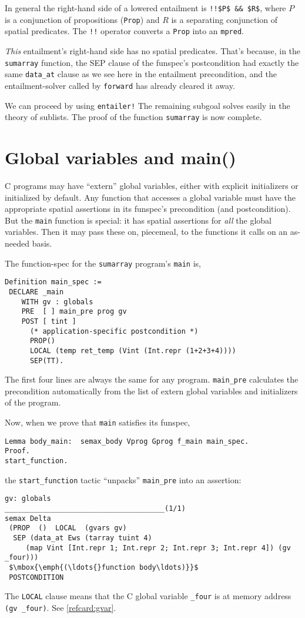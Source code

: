 \documentclass[12pt,fleqn,openany,oneside,showtrims]{memoir}
\begin{document}
In general the right-hand side of a lowered entailment is \lstinline{!!$P$ && $R$},
where $P$ is a conjunction of propositions (\lstinline{Prop})
and $R$ is a separating conjunction of spatial predicates.
The \lstinline{!!} operator converts a \lstinline{Prop} into
an \lstinline{mpred}.

\emph{This} entailment's right-hand side has no spatial
predicates.  That's because, in the \lstinline{sumarray} function,
the SEP clause of the
funspec's postcondition had exactly the same
\lstinline{data_at} clause as we see here in the
entailment precondition, and the entailment-solver
called by \lstinline{forward} has already cleared it away.

We can proceed by using \lstinline{entailer!}
The remaining subgoal solves easily in the
theory of sublists.  The proof of the function
\lstinline{sumarray} is now complete.

\chapter{Global variables and \upshape\textsf{main()}}
C programs may have ``extern'' global variables,
either with explicit initializers or initialized by
default.  Any function that accesses a global
variable must have the appropriate spatial
assertions in its funspec's precondition
(and postcondition).  But the \lstinline{main}
function is special: it has spatial
assertions for \emph{all} the global variables.
Then it may pass these on, piecemeal,
to the functions it calls on an as-needed basis.

The function-spec for the \lstinline{sumarray} program's \lstinline{main} is,
\begin{lstlisting}
Definition main_spec :=
 DECLARE _main  
    WITH gv : globals
    PRE  [ ] main_pre prog gv
    POST [ tint ]
      (* application-specific postcondition *)
      PROP()
      LOCAL (temp ret_temp (Vint (Int.repr (1+2+3+4))))
      SEP(TT).
\end{lstlisting}
The first four lines are always the same for any program.
\lstinline{main_pre} calculates the precondition
automatically from the list of extern global variables
and initializers of the program.\label{main-pre-page}

Now, when we prove that \lstinline{main} satisfies its
funspec,
\begin{lstlisting}
Lemma body_main:  semax_body Vprog Gprog f_main main_spec.
Proof.
start_function.
\end{lstlisting}
the \lstinline{start_function} tactic ``unpacks''
\lstinline{main_pre} into an assertion:
\pagebreak
\begin{lstlisting}
gv: globals
______________________________________(1/1)
semax Delta
 (PROP  ()  LOCAL  (gvars gv)
  SEP (data_at Ews (tarray tuint 4)
     (map Vint [Int.repr 1; Int.repr 2; Int.repr 3; Int.repr 4]) (gv _four)))
 $\mbox{\emph{(\ldots{}function body\ldots)}}$
 POSTCONDITION
\end{lstlisting}
The \lstinline{LOCAL} clause means that the C global
variable \lstinline{_four} is at memory address
\lstinline{(gv _four)}.    See \autoref{refcard:gvar}.
\end{document}

